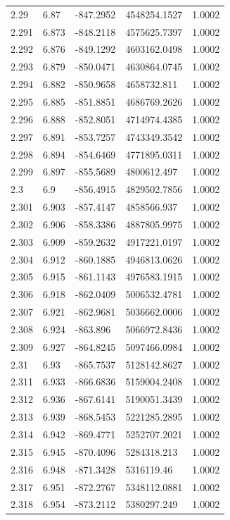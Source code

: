 \begin{tabular}{lllll}
2.29 & 6.87 & -847.2952 & 4548254.1527 & 1.0002 \\
2.291 & 6.873 & -848.2118 & 4575625.7397 & 1.0002 \\
2.292 & 6.876 & -849.1292 & 4603162.0498 & 1.0002 \\
2.293 & 6.879 & -850.0471 & 4630864.0745 & 1.0002 \\
2.294 & 6.882 & -850.9658 & 4658732.811 & 1.0002 \\
2.295 & 6.885 & -851.8851 & 4686769.2626 & 1.0002 \\
2.296 & 6.888 & -852.8051 & 4714974.4385 & 1.0002 \\
2.297 & 6.891 & -853.7257 & 4743349.3542 & 1.0002 \\
2.298 & 6.894 & -854.6469 & 4771895.0311 & 1.0002 \\
2.299 & 6.897 & -855.5689 & 4800612.497 & 1.0002 \\
2.3 & 6.9 & -856.4915 & 4829502.7856 & 1.0002 \\
2.301 & 6.903 & -857.4147 & 4858566.937 & 1.0002 \\
2.302 & 6.906 & -858.3386 & 4887805.9975 & 1.0002 \\
2.303 & 6.909 & -859.2632 & 4917221.0197 & 1.0002 \\
2.304 & 6.912 & -860.1885 & 4946813.0626 & 1.0002 \\
2.305 & 6.915 & -861.1143 & 4976583.1915 & 1.0002 \\
2.306 & 6.918 & -862.0409 & 5006532.4781 & 1.0002 \\
2.307 & 6.921 & -862.9681 & 5036662.0006 & 1.0002 \\
2.308 & 6.924 & -863.896 & 5066972.8436 & 1.0002 \\
2.309 & 6.927 & -864.8245 & 5097466.0984 & 1.0002 \\
2.31 & 6.93 & -865.7537 & 5128142.8627 & 1.0002 \\
2.311 & 6.933 & -866.6836 & 5159004.2408 & 1.0002 \\
2.312 & 6.936 & -867.6141 & 5190051.3439 & 1.0002 \\
2.313 & 6.939 & -868.5453 & 5221285.2895 & 1.0002 \\
2.314 & 6.942 & -869.4771 & 5252707.2021 & 1.0002 \\
2.315 & 6.945 & -870.4096 & 5284318.213 & 1.0002 \\
2.316 & 6.948 & -871.3428 & 5316119.46 & 1.0002 \\
2.317 & 6.951 & -872.2767 & 5348112.0881 & 1.0002 \\
2.318 & 6.954 & -873.2112 & 5380297.249 & 1.0002 \\

\end{tabular}
